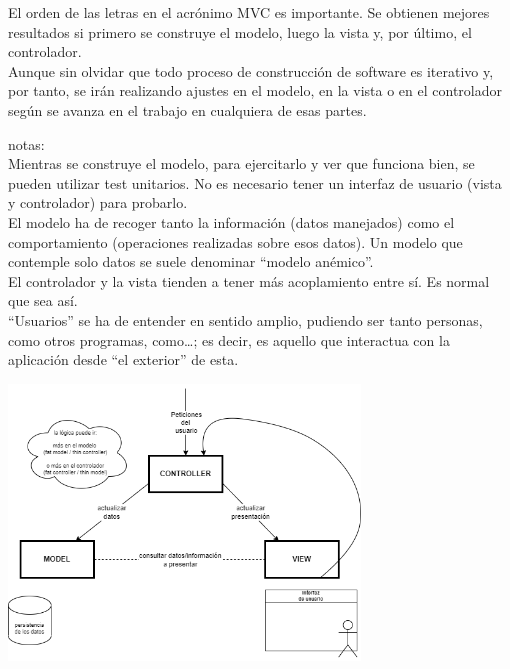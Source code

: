 \documentclass[spanish,12pt,a4paper,final,oneside]{book}
\begin{document}
El orden de las letras en el acrónimo MVC es importante. Se obtienen mejores resultados si primero se construye el modelo, luego la vista y, por último, el controlador. 
\\Aunque sin olvidar que todo proceso de construcción de software es iterativo y, por tanto, se irán realizando ajustes en el modelo, en la vista o en el controlador según se avanza en el trabajo en cualquiera de esas partes.

\begin{footnotesize}
notas:
\\Mientras se construye el modelo, para ejercitarlo y ver que funciona bien, se pueden utilizar test unitarios. No es necesario tener un interfaz de usuario (vista y controlador) para probarlo.
\\El modelo ha de recoger tanto la información (datos manejados) como el comportamiento (operaciones realizadas sobre esos datos). Un modelo que contemple solo datos se suele denominar ``modelo anémico''.
\\El controlador y la vista tienden a tener más acoplamiento entre sí. Es normal que sea así.
\\``Usuarios'' se ha de entender en sentido amplio, pudiendo ser tanto personas, como otros programas, como\ldots; es decir, es aquello que interactua con la aplicación desde ``el exterior'' de esta.
\end{footnotesize}

\begin{center}\includegraphics[width=0.7\textwidth]{division en capas - MVC}\end{center}
\end{document}

